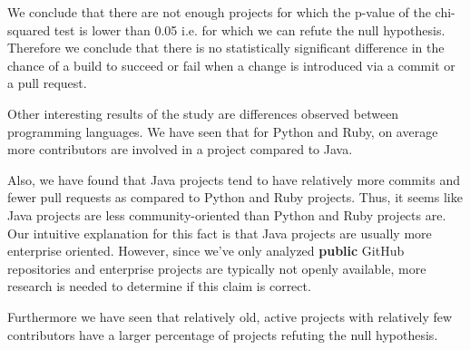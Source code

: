 We conclude that there are not enough projects for which the p-value of the chi-squared test is lower than 0.05 i.e. for which we can refute the null hypothesis.
Therefore we conclude that there is no statistically significant difference in the chance of a build to succeed or fail when a change is introduced via a commit or a pull request.

Other interesting results of the study are differences observed between programming languages. 
We have seen that for Python and Ruby, on average more contributors are involved in a project compared to Java.

Also, we have found that Java projects tend to have relatively more commits and fewer pull requests as compared to Python and Ruby projects.
Thus, it seems like Java projects are less community-oriented than Python and Ruby projects are.
Our intuitive explanation for this fact is that Java projects are usually more enterprise oriented.
However, since we've only analyzed \textbf{public} GitHub repositories and enterprise projects are typically not openly available, more research is needed to determine if this claim is correct.

Furthermore we have seen that relatively old, active projects with relatively few contributors have a larger percentage of projects refuting the null hypothesis.
